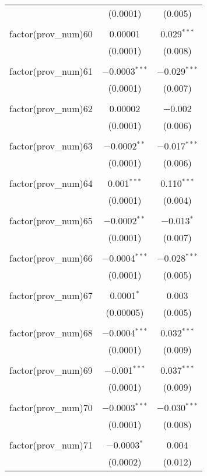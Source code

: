 \begin{table}[ht!]
\begin{tabular}{@{\extracolsep{5pt}}lcc}
  & (0.0001) & (0.005) \\ 
  & & \\ 
 factor(prov\_num)60 & 0.00001 & 0.029$^{***}$ \\ 
  & (0.0001) & (0.008) \\ 
  & & \\ 
 factor(prov\_num)61 & $-$0.0003$^{***}$ & $-$0.029$^{***}$ \\ 
  & (0.0001) & (0.007) \\ 
  & & \\ 
 factor(prov\_num)62 & 0.00002 & $-$0.002 \\ 
  & (0.0001) & (0.006) \\ 
  & & \\ 
 factor(prov\_num)63 & $-$0.0002$^{**}$ & $-$0.017$^{***}$ \\ 
  & (0.0001) & (0.006) \\ 
  & & \\ 
 factor(prov\_num)64 & 0.001$^{***}$ & 0.110$^{***}$ \\ 
  & (0.0001) & (0.004) \\ 
  & & \\ 
 factor(prov\_num)65 & $-$0.0002$^{**}$ & $-$0.013$^{*}$ \\ 
  & (0.0001) & (0.007) \\ 
  & & \\ 
 factor(prov\_num)66 & $-$0.0004$^{***}$ & $-$0.028$^{***}$ \\ 
  & (0.0001) & (0.005) \\ 
  & & \\ 
 factor(prov\_num)67 & 0.0001$^{*}$ & 0.003 \\ 
  & (0.00005) & (0.005) \\ 
  & & \\ 
 factor(prov\_num)68 & $-$0.0004$^{***}$ & 0.032$^{***}$ \\ 
  & (0.0001) & (0.009) \\ 
  & & \\ 
 factor(prov\_num)69 & $-$0.001$^{***}$ & 0.037$^{***}$ \\ 
  & (0.0001) & (0.009) \\ 
  & & \\ 
 factor(prov\_num)70 & $-$0.0003$^{***}$ & $-$0.030$^{***}$ \\ 
  & (0.0001) & (0.008) \\ 
  & & \\ 
 factor(prov\_num)71 & $-$0.0003$^{*}$ & 0.004 \\ 
  & (0.0002) & (0.012) \\ 

\end{tabular}
\end{table}

